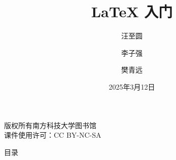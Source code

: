 \documentclass{libs/SUSTech_format}
\title[\LaTeX{} 入门]{\huge \textbf{\LaTeX{} 入门}}
\author[CRA 计算机研究协会]{汪至圆\and 李子强  \and 樊青远}
\institute[SUSTech]{
    \normalsize
    南方科技大学
}
\date{2025年3月12日}
\begin{document}



{
	
	\begin{frame}
		\begin{titlepage}
			\vfill %
			\hfill %
			\vspace{-2.8em}
			{
				\begin{minipage}{0.25\textwidth}
					\raggedright\tiny
					版权所有\textcopyright 南方科技大学图书馆 \\
					课件使用许可：CC BY-NC-SA
				\end{minipage}
			}
		\end{titlepage}
	\end{frame}
}

\begin{frame}{目录}
	\begin{multicols}{2}
		\tableofcontents
	\end{multicols}
\end{frame}
\end{document}
